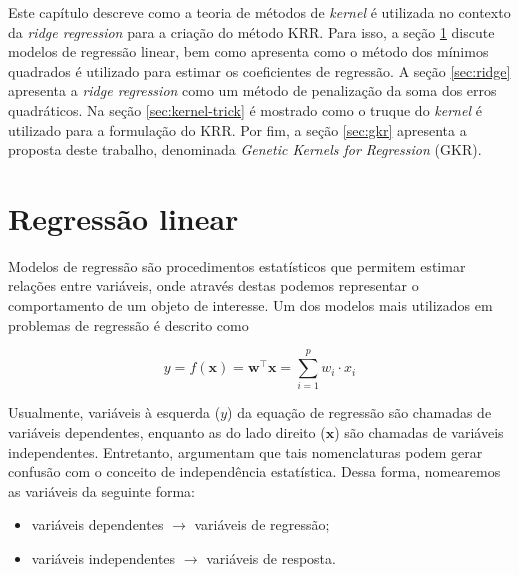 Este capítulo descreve como a teoria de métodos de \textit{kernel} é utilizada no contexto da \textit{\textit{ridge regression}} para a criação do método KRR. Para isso, a seção \ref{sec:linreg} discute modelos de regressão linear, bem como apresenta como o método dos mínimos quadrados é utilizado para estimar %
os coeficientes de regressão. A seção \ref{sec:ridge} apresenta a \textit{ridge regression} como um método de penalização da soma dos erros quadráticos. Na seção \ref{sec:kernel-trick} é mostrado como o truque do \textit{kernel} é utilizado para a formulação do KRR. Por fim, a seção \ref{sec:gkr} apresenta a proposta deste trabalho, denominada \textit{Genetic Kernels for Regression} (GKR).

\section{Regressão linear} \label{sec:linreg}
Modelos de regressão são procedimentos estatísticos que permitem estimar relações entre variáveis, onde através destas podemos representar o comportamento de um objeto de interesse. Um dos modelos mais utilizados em problemas de regressão é descrito como

\begin{equation}
    \label{ch2:eq1}
    y = f(\mathbf{x}) = \mathbf{w}^{\top}\mathbf{x} = \sum_{i=1}^{p}{w_i \cdot x_i}
\end{equation}

Usualmente, variáveis à esquerda ($y$) da equação de regressão são chamadas de variáveis dependentes, enquanto as do lado direito ($\mathbf{x}$) são chamadas de variáveis independentes. Entretanto,  argumentam que tais nomenclaturas podem gerar confusão com o conceito de independência estatística. Dessa forma, nomearemos as variáveis da seguinte forma:

\begin{itemize}
    \item variáveis dependentes $\rightarrow$ variáveis de regressão;%
    \item variáveis independentes $\rightarrow$ variáveis de resposta.
\end{itemize}

